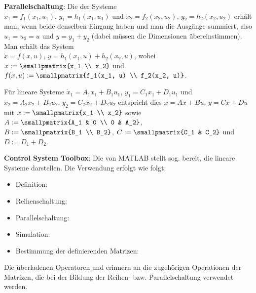\linie

\textbf{Parallelschaltung}:
Die  der Systeme\\
$\dot{x}_1 = f_1(x_1, u_1)$, $y_1 = h_1(x_1, u_1)$ und
$\dot{x}_2 = f_2(x_2, u_2)$, $y_2 = h_2(x_2, u_2)$
erhält man, wenn beide denselben Eingang haben und man die Ausgänge summiert,
also $u_1 = u_2 = u$ und $y = y_1 + y_2$
(dabei müssen die Dimensionen übereinstimmen).
Man erhält das System\\
$\dot{x} = f(x, u)$, $y = h_1(x_1, u) + h_2(x_2, u)$,
wobei $x := \smallpmatrix{x_1 \\ x_2}$ und
$f(x, u) := \smallpmatrix{f_1(x_1, u) \\ f_2(x_2, u)}$.

Für lineare Systeme
$\dot{x}_1 = A_1 x_1 + B_1 u_1$, $y_1 = C_1 x_1 + D_1 u_1$ und\\
$\dot{x}_2 = A_2 x_2 + B_2 u_2$, $y_2 = C_2 x_2 + D_2 u_2$ entspricht dies
$\dot{x} = Ax + Bu$, $y = Cx + Du$\\
mit $x := \smallpmatrix{x_1 \\ x_2}$ sowie
$A := \smallpmatrix{A_1 & 0 \\ 0 & A_2}$,
$B := \smallpmatrix{B_1 \\ B_2}$,
$C := \smallpmatrix{C_1 & C_2}$ und
$D := D_1 + D_2$.

\linie
\pagebreak

\textbf{Control System Toolbox}:
Die  von MATLAB stellt sog.  bereit,
die lineare Systeme darstellen.
Die Verwendung erfolgt wie folgt:
\begin{itemize}
    \item
    Definition: 
    
    \item
    Reihenschaltung: 
    
    \item
    Parallelschaltung: 
    
    \item
    Simulation: 
    
    \item
    Bestimmung der definierenden Matrizen: 
\end{itemize}
Die überladenen Operatoren \code{*} und \code{+} erinnern an die zugehörigen Operationen
der Matrizen, die bei der Bildung der Reihen- bzw. Parallelschaltung verwendet werden.

